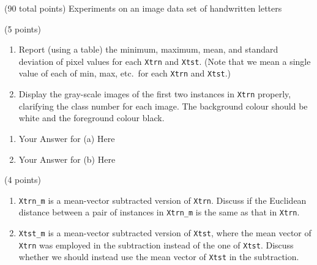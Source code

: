 \documentclass[12pt]{article}
\begin{document}
\clearpage
%
% 
\newcommand{\qTwoTitle}{Experiments on an image data set of handwritten letters}
%

  \begin{question}{(90 total points) \qTwoTitle}



%
%
\medskip
\begin{subquestion}{(5 points)
  } \label{q2.1}
  \begin{enumerate}\NARROWITEM
  \item Report (using a table) the minimum, maximum, mean, and standard deviation of pixel values for each {\tt Xtrn} and {\tt Xtst}.
    (Note that we mean a single value of each of min, max, etc.\ for each {\tt Xtrn} and {\tt Xtst}.)
  \item Display the gray-scale images of the first two instances in {\tt Xtrn} properly, clarifying the class number for each image.
    The background colour should be white and the foreground colour black.
  \end{enumerate}
   

  \begin{answerbox}{0.55\textheight}
    \begin{enumerate}
    \item Your Answer for (a) Here
    \item Your Answer for (b) Here
    \end{enumerate}
  \end{answerbox}
  


\end{subquestion}

\begin{subquestion}{(4 points)
  } \label{q2.2}
  \begin{enumerate}\NARROWITEM
  \item {\tt Xtrn\_m} is a mean-vector subtracted version of {\tt Xtrn}.
    Discuss if the Euclidean distance between a pair of instances in {\tt Xtrn\_m} is the same as that in {\tt Xtrn}.
  \item {\tt Xtst\_m} is a mean-vector subtracted version of {\tt Xtst}, where the mean vector of {\tt Xtrn} was employed in the subtraction instead of the one of {\tt Xtst}.
    Discuss whether we should instead use the mean vector of {\tt Xtst} in the subtraction.
  \end{enumerate}
   


\end{subquestion}
\end{question}
\end{document}
